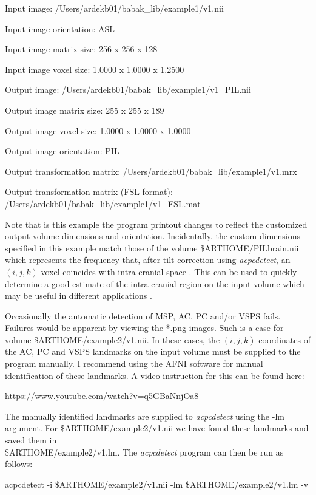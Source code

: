 \documentclass[11pt]{article}
\begin{document}
Input image: /Users/ardekb01/babak\_lib/example1/v1.nii

Input image orientation: ASL

Input image matrix size: 256 x 256 x 128

Input image voxel size: 1.0000 x 1.0000 x 1.2500

Output image: /Users/ardekb01/babak\_lib/example1/v1\_PIL.nii

Output image matrix size: 255 x 255 x 189 

Output image voxel size: 1.0000 x 1.0000 x 1.0000

Output image orientation: PIL

Output transformation matrix: /Users/ardekb01/babak\_lib/example1/v1.mrx

Output transformation matrix (FSL format): /Users/ardekb01/babak\_lib/example1/v1\_FSL.mat 

\noindent Note that is this example the program printout changes to reflect the customized output volume dimensions
and orientation.  Incidentally, the custom dimensions specified in this example match those of
the volume \$ARTHOME/PILbrain.nii which represents the frequency that, after tilt-correction using
{\it acpcdetect}, an $(i,j,k)$ voxel coincides with intra-cranial space \citep{pmid35288224}. 
This can be used to quickly determine a good estimate of the intra-cranial region on the input volume
which may be useful in different applications \citep{pmid35288224}.
\vspace{3mm}

 Occasionally the automatic detection of MSP, AC, PC and/or VSPS
fails. Failures would be apparent by viewing the *.png images.
Such is a case for volume \$ARTHOME/example2/v1.nii.  In these cases, the $(i,j,k)$ coordinates
of the AC, PC and VSPS landmarks on the input volume must be supplied to the program manually.  I recommend
using the AFNI software for manual identification of these landmarks. A video instruction for this 
can be found here: 

https://www.youtube.com/watch?v=q5GBaNnjOa8 

\noindent The manually identified landmarks are supplied to {\it acpcdetect} using the -lm argument.  For 
\$ARTHOME/example2/v1.nii we have found these landmarks and saved them in \\
\$ARTHOME/example2/v1.lm.  The {\it acpcdetect} program can then be run as follows:

acpcdetect -i \$ARTHOME/example2/v1.nii -lm \$ARTHOME/example2/v1.lm -v
\end{document}
